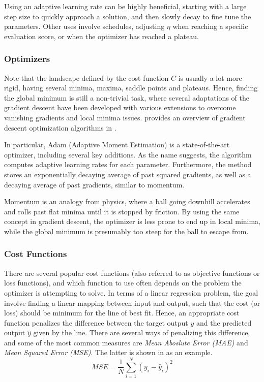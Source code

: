         Using an adaptive learning rate can be highly beneficial, starting with a large step size to quickly approach a solution, and then slowly decay to fine tune the parameters. Other uses involve schedules, adjusting $\eta$ when reaching a specific evaluation score, or when the optimizer has reached a plateau.
    
    \subsubsection{Optimizers}
    
        Note that the landscape defined by the cost function $C$ is usually a lot more rigid, having several minima, maxima, saddle points and plateaus. Hence, finding the global minimum is still a non-trivial task, where several adaptations of the gradient descent have been developed with various extensions to overcome vanishing gradients and local minima issues. 
        \citeauthor{ruder2017overview} provides an overview of gradient descent optimization algorithms in \cite{ruder2017overview}.
        
        In particular, Adam (Adaptive Moment Estimation) is a state-of-the-art optimizer, including several key additions. As the name suggests, the algorithm computes adaptive learning rates for each parameter. Furthermore, the method stores an exponentially decaying average of past squared gradients, as well as a decaying average of past gradients, similar to momentum.
        
        Momentum is an analogy from physics, where a ball going downhill accelerates and rolls past flat minima until it is stopped by friction. By using the same concept in gradient descent, the optimizer is less prone to end up in local minima, while the global minimum is presumably too steep for the ball to escape from.

    \subsubsection{Cost Functions}
    
        There are several popular cost functions (also referred to as objective functions or loss functions), and which function to use often depends on the problem the optimizer is attempting to solve. 
        In terms of a linear regression problem, the goal involve finding a linear mapping between input and output, such that the cost (or loss) should be minimum for the line of best fit. Hence, an appropriate cost function penalizes the difference between the target output $y$ and the predicted output $\hat{y}$ given by the line. 
        There are several ways of penalizing this difference, and some of the most common measures are \emph{Mean Aboslute Error (MAE)} and \emph{Mean Squared Error (MSE)}. The latter is shown in  as an example.
        \begin{equation}\label{eq:mopt-mseloss}
            MSE = \frac{1}{N}\sum_{i=1}^N(y_i-\hat{y}_i)^2
        \end{equation}
        
